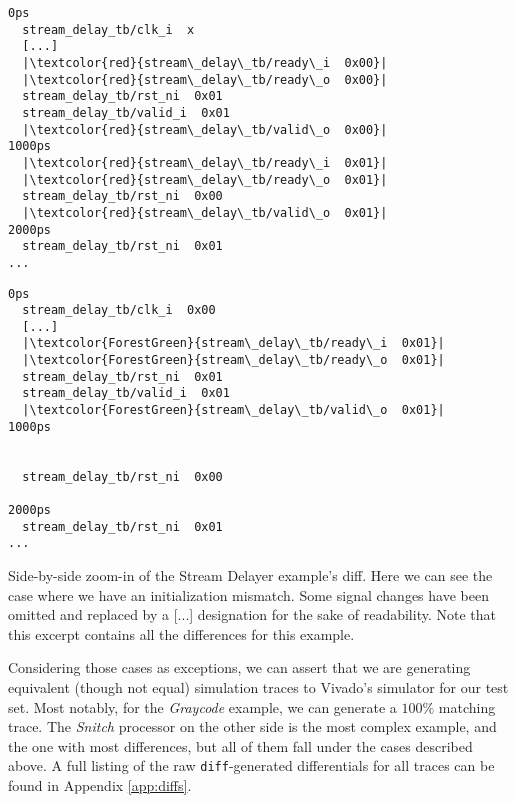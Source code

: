 \begin{listing}[ht]
  \lstset{
    escapeinside=||,
    basicstyle=\footnotesize\ttfamily,
    stepnumber=1
  }
  \begin{minipage}{0.45\textwidth}
    \begin{lstlisting}
0ps
  stream_delay_tb/clk_i  x
  [...]
  |\textcolor{red}{stream\_delay\_tb/ready\_i  0x00}|
  |\textcolor{red}{stream\_delay\_tb/ready\_o  0x00}|
  stream_delay_tb/rst_ni  0x01
  stream_delay_tb/valid_i  0x01
  |\textcolor{red}{stream\_delay\_tb/valid\_o  0x00}|
1000ps
  |\textcolor{red}{stream\_delay\_tb/ready\_i  0x01}|
  |\textcolor{red}{stream\_delay\_tb/ready\_o  0x01}|
  stream_delay_tb/rst_ni  0x00
  |\textcolor{red}{stream\_delay\_tb/valid\_o  0x01}|
2000ps
  stream_delay_tb/rst_ni  0x01
...
        \end{lstlisting}
  \end{minipage}
  \hfill
  \begin{minipage}{0.45\textwidth}
    \begin{lstlisting}
0ps
  stream_delay_tb/clk_i  0x00
  [...]
  |\textcolor{ForestGreen}{stream\_delay\_tb/ready\_i  0x01}|
  |\textcolor{ForestGreen}{stream\_delay\_tb/ready\_o  0x01}|
  stream_delay_tb/rst_ni  0x01
  stream_delay_tb/valid_i  0x01
  |\textcolor{ForestGreen}{stream\_delay\_tb/valid\_o  0x01}|
1000ps


  stream_delay_tb/rst_ni  0x00

2000ps
  stream_delay_tb/rst_ni  0x01
...
        \end{lstlisting}
  \end{minipage}
  \caption[Side-by-side zoom-in of the Stream Delayer example's diff.]{Side-by-side zoom-in of the Stream Delayer example's diff. Here we can see the case where we have an initialization mismatch. Some signal changes have been omitted and replaced by a [...] designation for the sake of readability. Note that this excerpt contains all the differences for this example.}
  \label{listing:diff-sd}
\end{listing}

Considering those cases as exceptions, we can assert that we are generating equivalent (though not equal) simulation traces to Vivado's simulator for our test set. Most notably, for the \textit{Graycode} example, we can generate a $100\%$ matching trace. The \textit{Snitch} processor on the other side is the most complex example, and the one with most differences, but all of them fall under the cases described above. A full listing of the raw \texttt{diff}-generated differentials for all traces can be found in Appendix \ref{app:diffs}.

